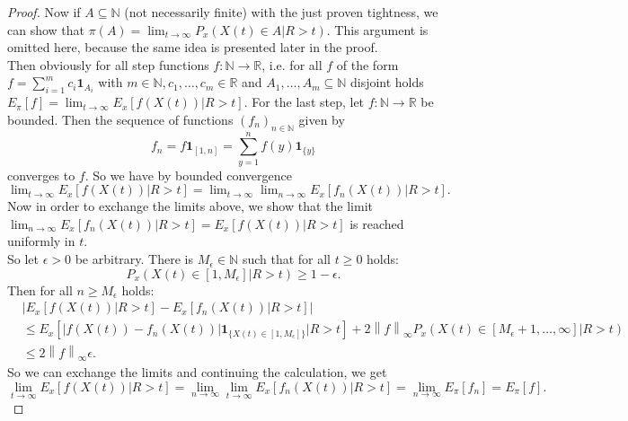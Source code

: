 \documentclass[12pt,a4paper]{scrartcl}
\numberwithin{equation}{section}
\newcommand{\R}{\mathbb{R}} %
\newcommand{\N}{\mathbb{N}} %
\begin{document}
\begin{proof}
Now if $ A \subseteq \N $ (not necessarily finite) with the just proven tightness, we can show that $\pi\left(A\right) = \lim_{t \to \infty} P_x\left(X\left(t\right) \in A | R > t\right). $ This argument is omitted here, because the same idea is presented later in the proof.\\
Then obviously for all step functions $f: \N \to \R$, i.e. for all $f$ of the form $f = \sum_{i=1}^m c_i \textbf{1}_{A_i}$ with $m \in \N, c_1, \ldots , c_m \in \R$ and $A_1, \ldots, A_m \subseteq \N$ disjoint holds $E_{\pi}\left[f\right] = \lim_{t \to \infty} E_x\left[f\left(X\left(t\right) \right) | R > t\right].$
For the last step, let $f:\N \to \R$ be bounded. Then the sequence of functions $\left(f_n \right)_{n \in \N}$ given by 
$$ f_n = f \textbf{1}_{\left[1, n\right] } = \sum_{y = 1}^n f\left(y\right) \textbf{1}_{\lbrace y \rbrace}$$
converges to $f$.
So we have by bounded convergence $\lim_{t \to \infty} E_x\left[f\left(X\left(t\right) \right) | R > t\right] = \lim_{t \to \infty} \lim_{n \to \infty} E_x\left[f_n\left(X\left(t\right) \right) | R> t\right].$
Now in order to exchange the limits above, we show that the limit $\lim_{n \to \infty} E_x\left[f_n\left(X\left(t\right)\right)| R > t \right] = E_x\left[f\left(X\left(t\right) \right) | R > t\right]$ is reached uniformly in $t$.\\
So let $\epsilon > 0 $ be arbitrary. There is $M_{\epsilon} \in \N$ such that for all $ t \geq 0 $ holds:
$$ P_x\left( X\left(t\right) \in \left[1, M_{\epsilon} \right] | R > t\right) \geq 1 - \epsilon.$$
Then for all $n \geq M_{\epsilon}$ holds:
\begin{align*}
&\left|E_x\left[f\left(X\left(t\right) \right) | R > t\right] - E_x\left[f_n\left(X\left(t\right) \right) | R > t\right] \right| \\
&\leq E_x\left[ \left|f\left(X\left(t\right) \right) - f_n\left(X\left(t\right) \right) \right| \textbf{1}_{\lbrace X\left(t\right) \in \left[1,M_{\epsilon} \right]  \rbrace} | R > t\right] + 2 \left\|f \right\|_{\infty} P_x\left(X\left(t\right) \in \left[M_{\epsilon} +1, \ldots, \infty \right] | R > t\right) \\
&\leq  2 \left\|f \right\|_{\infty} \epsilon. 
\end{align*}
So we can exchange the limits and continuing the calculation, we get
$$ \lim_{t \to \infty} E_x\left[f\left(X\left(t\right) \right) | R > t\right] = \lim_{n \to \infty} \lim_{t \to \infty} E_x\left[f_n\left(X\left(t\right) \right) | R> t\right] = \lim_{n \to \infty} E_{\pi}\left[f_n \right] = E_{\pi}\left[f\right]. $$
\end{proof}
\end{document}
